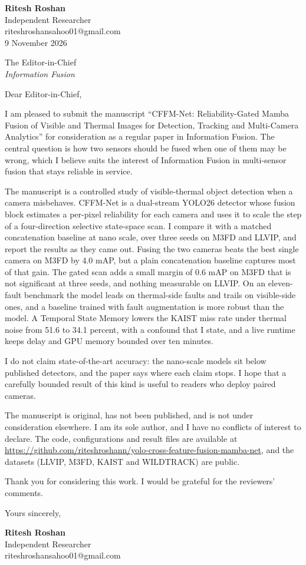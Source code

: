 \documentclass[11pt]{article}
\begin{document}
\raggedright
\textbf{Ritesh Roshan}\\
Independent Researcher\\
riteshroshansahoo01@gmail.com\\
9 November 2026

The Editor-in-Chief\\
\textit{Information Fusion}

Dear Editor-in-Chief,

I am pleased to submit the manuscript ``CFFM-Net: Reliability-Gated Mamba Fusion of Visible and Thermal Images for Detection, Tracking and Multi-Camera Analytics'' for consideration as a regular paper in Information Fusion. The central question is how two sensors should be fused when one of them may be wrong, which I believe suits the interest of Information Fusion in multi-sensor fusion that stays reliable in service.

The manuscript is a controlled study of visible-thermal object detection when a camera misbehaves. CFFM-Net is a dual-stream YOLO26 detector whose fusion block estimates a per-pixel reliability for each camera and uses it to scale the step of a four-direction selective state-space scan. I compare it with a matched concatenation baseline at nano scale, over three seeds on M3FD and LLVIP, and report the results as they came out. Fusing the two cameras beats the best single camera on M3FD by 4.0 mAP, but a plain concatenation baseline captures most of that gain. The gated scan adds a small margin of 0.6 mAP on M3FD that is not significant at three seeds, and nothing measurable on LLVIP. On an eleven-fault benchmark the model leads on thermal-side faults and trails on visible-side ones, and a baseline trained with fault augmentation is more robust than the model. A Temporal State Memory lowers the KAIST miss rate under thermal noise from 51.6 to 34.1 percent, with a confound that I state, and a live runtime keeps delay and GPU memory bounded over ten minutes.

I do not claim state-of-the-art accuracy: the nano-scale models sit below published detectors, and the paper says where each claim stops. I hope that a carefully bounded result of this kind is useful to readers who deploy paired cameras.

The manuscript is original, has not been published, and is not under consideration elsewhere. I am its sole author, and I have no conflicts of interest to declare. The code, configurations and result files are available at \url{https://github.com/riteshroshann/yolo-cross-feature-fusion-mamba-net}, and the datasets (LLVIP, M3FD, KAIST and WILDTRACK) are public.

Thank you for considering this work. I would be grateful for the reviewers' comments.

Yours sincerely,

\vspace{0.4em}
\textbf{Ritesh Roshan}\\
Independent Researcher\\
riteshroshansahoo01@gmail.com
\end{document}
